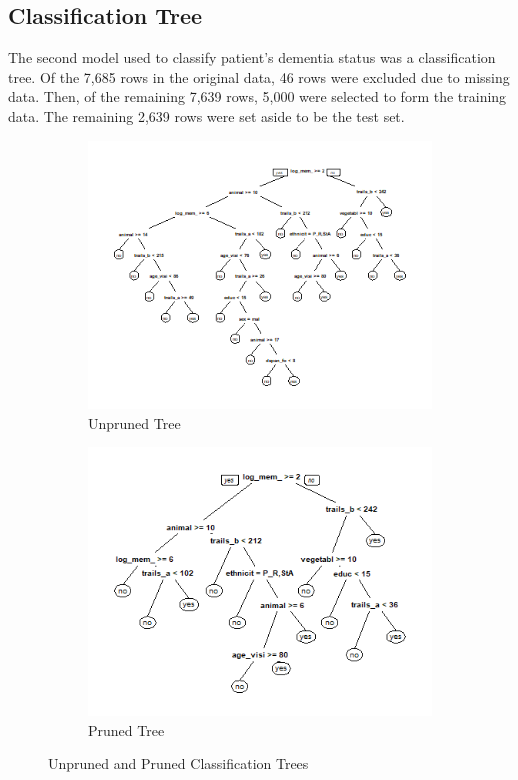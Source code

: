 \documentclass[a4paper,man,natbib,11pt]{article}
\begin{document}
\subsection{Classification Tree}

The second model used to classify patient's dementia status was a classification tree. Of the 7,685 rows in the original data, 46 rows were excluded due to missing data. Then, of the remaining 7,639 rows, 5,000 were selected to form the training data. The remaining 2,639 rows were set aside to be the test set.

\begin{figure}[h!]
\centering
\begin{subfigure}{.5\textwidth}
  \centering
  \includegraphics[width=\linewidth]{unpruned_tree.png}
  \caption{Unpruned Tree}
  \label{fig:sub1}
\end{subfigure}%
\begin{subfigure}{.5\textwidth}
  \centering
  \includegraphics[width=\linewidth]{pruned_tree.png}
  \caption{Pruned Tree}
  \label{fig:sub2}
\end{subfigure}
\caption{Unpruned and Pruned Classification Trees}
\label{fig:test}
\end{figure}
\end{document}
